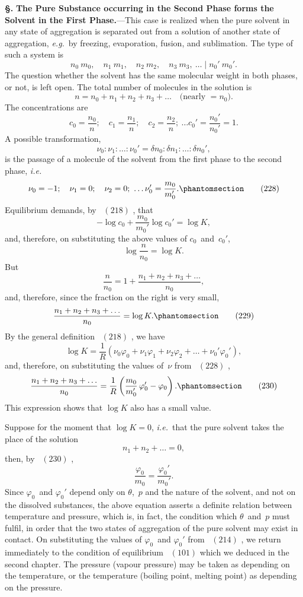 \documentclass[12pt]{book}[2005/09/16]
\newcommand{\Chg}[2]{#2}
\newcommand{\Add}[1]{\Chg{}{#1}}
\newcommand{\Section}[1]{
  \medskip\par\textbf{§\;#1}
  \label{section:#1}
}
\newcommand{\Tag}[1]{%
  \phantomsection\label{eqn:#1}\tag*{\ensuremath{#1}}%
}
\newcommand{\Eq}[1]{%
  \hyperref[eqn:#1]{\ensuremath{#1}}%
}
\newcommand{\PageSep}[1]{\ignorespaces}
\newcommand{\Topic}[1]{\textbf{#1}}
\newcommand{\eg}{\emph{e.g.}}
\newcommand{\ie}{\emph{i.e.}}
\begin{document}
\Section{268.} \Topic{The Pure Substance occurring in the Second
Phase forms the Solvent in the First Phase.}---This case
is realized when the pure solvent in any state of aggregation
is separated out from a solution of another state of aggregation,
\eg\ by freezing, evaporation, fusion, and sublimation.
The type of such a system is
\[
n_{0}\ m_{0},\quad
n_{1}\ m_{1},\quad
n_{2}\ m_{2},\quad
n_{3}\ m_{3},\ \dots \mid
n_{0}'\ m_{0}'.
\]
The question whether the solvent has the same molecular
weight in both phases, or not, is left open. The total
number of molecules in the solution is
\[
n = n_{0} + n_{1} + n_{2} + n_{3} + \dots\quad\text{(nearly $= n_{0}$).}
\]
The concentrations are
\[
c_{0} = \frac{n_{0}}{n};\quad
c_{1} = \frac{n_{1}}{n};\quad
c_{2} = \frac{n_{2}}{n};\ \dots
c_{0}' = \frac{n_{0}'}{n_{0}'} = 1.
\]
A possible transformation,
\[
\nu_{0} : \nu_{1} \Add{:} \dots : \nu_{0}' = \delta n_{0} : \delta n_{1} \Add{:} \dots : \delta n_{0}',
\]
\PageSep{246}
is the passage of a molecule of the solvent from the first
phase to the second phase, \ie\
\[
\nu_{0} = -1;\quad
\nu_{1} = 0;\quad
\nu_{2} = 0;\ \dots
\nu_{0}' = \frac{m_{0}}{m_{0}'}.
\Tag{(228)}
\]
Equilibrium demands, by~\Eq{(218)}, that
\[
-\log c_{0} + \frac{m_{0}}{m_{0}'} \log c_{0}' = \log K,
\]
and, therefore, on substituting the above values of $c_{0}$~and~$c_{0}'$,
\[
\log \frac{n}{n_{0}} = \log K.
\]
But
\[
\frac{n}{n_{0}} = 1 + \frac{n_{1} + n_{2} + n_{3} + \dots}{n_{0}},
\]
and, therefore, since the fraction on the right is very small,
\[
\frac{n_{1} + n_{2} + n_{3} + \dots}{n_{0}} = \log K.
\Tag{(229)}
\]
By the general definition~\Eq{(218)}, we have
\[
\log K = \frac{1}{R} (\nu_{0} \varphi_{0} + \nu_{1} \varphi_{1} + \nu_{2} \varphi_{2} + \dots + \nu_{0}' \varphi_{0}'),
\]
and, therefore, on substituting the values of~$\nu$ from~\Eq{(228)},
\[
\frac{n_{1} + n_{2} + n_{3} + \dots}{n_{0}} = \frac{1}{R} \left(\frac{m_{0}}{m_{0}'}\, \varphi_{0}' - \varphi_{0}\right)\Add{.}
\Tag{(230)}
\]
This expression shows that $\log K$ also has a small value.

Suppose for the moment that $\log K = 0$, \ie\ that the
pure solvent takes the place of the solution
\[
n_{1} + n_{2} + \dots = 0,
\]
then, by~\Eq{(230)},
\[
\frac{\varphi_{0}}{m_{0}} = \frac{\varphi_{0}'}{m_{0}'}.
\]
\PageSep{247}
Since $\varphi_{0}$~and $\varphi_{0}'$ depend only on $\theta$,~$p$ and the nature of the
solvent, and not on the dissolved substances, the above
equation asserts a definite relation between temperature and
pressure, which is, in fact, the condition which $\theta$~and~$p$ must
fulfil, in order that the two states of aggregation of the pure
solvent may exist in contact. On substituting the values of
$\varphi_{0}$~and $\varphi_{0}'$ from~\Eq{(214)}, we return immediately to the condition
of equilibrium~\Eq{(101)} which we deduced in the second chapter.
The pressure (vapour pressure) may be taken as depending
on the temperature, or the temperature (boiling point, melting
point) as depending on the pressure.
\end{document}
